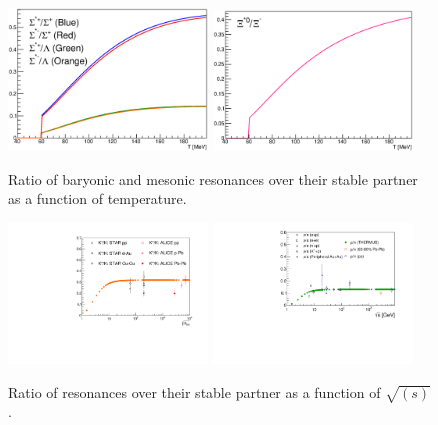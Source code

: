 \begin{figure}[!htbp]
\begin{center}
		\includegraphics[width=200px]{./Version1/FigChapter2/SigmaStarRatio}
		\includegraphics[width=200px]{./Version1/FigChapter2/XiStarToXi}
		\caption{\label{result1} Ratio of baryonic and mesonic resonances over their stable partner as a function of temperature.}
	\end{center}\hspace{2pc}%
\end{figure}




\begin{figure}[!htbp]
\begin{center}
	\includegraphics[width=200px]{./Version1/FigChapter2/Kstar_sqrt_s.pdf}
	\includegraphics[width=200px]{./Version1/FigChapter2/RhoToPion_sqrt_s.pdf}
	\caption{\label{result2} Ratio of resonances over their stable partner as a function of $\sqrt{(s)}$.}
\end{center}\hspace{2pc}%
\end{figure}


